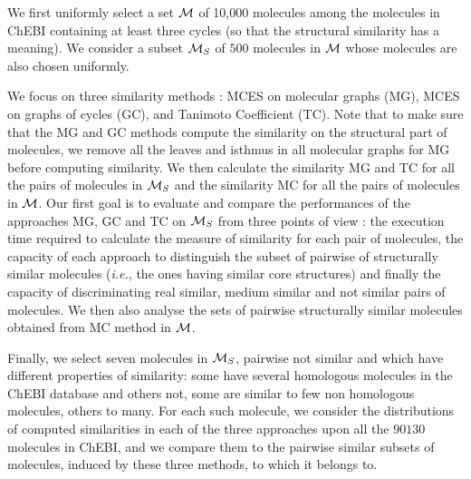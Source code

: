 \documentclass[10pt,letterpaper]{article}
\begin{document}
We first uniformly select a set $\cal M$ of 10,000 molecules among the molecules in ChEBI containing at least three cycles (so that the structural similarity has a meaning). We consider a subset ${\cal M}_S$ of $500$ molecules in $ \cal M $ whose molecules are also chosen uniformly.

We   focus on three similarity methods : MCES on molecular graphs (MG), MCES on graphs of cycles (GC), and Tanimoto Coefficient (TC). Note that to make sure that the MG and GC methods compute the similarity on the structural part of molecules, we remove all the leaves and isthmus in all molecular graphs for MG before computing similarity. We  then calculate the similarity MG and TC for all the pairs of  molecules in ${\cal M}_S$ and the similarity MC for all the pairs of molecules in $ \cal M $.   Our first goal is to evaluate and compare the performances of the approaches MG, GC and TC on ${\cal M}_S$ from three points of view : the execution time required to calculate the measure of similarity for each pair of molecules, the capacity of each approach to distinguish the subset of pairwise  of  structurally  similar molecules (\textit{i.e.}, the ones having similar core structures) and finally the capacity of discriminating real similar, medium similar and not similar pairs of molecules. We then also analyse the sets of pairwise structurally similar molecules obtained from MC method in $ \cal M $.

Finally, we select seven molecules in ${\cal M}_S$, pairwise not similar and which have different properties of   similarity: some have several homologous molecules in the ChEBI database and others not, some are similar to few non homologous molecules, others to many. For each such molecule, we consider the distributions of computed similarities in each of the three approaches upon all the $90130$ molecules in ChEBI, and we compare them to the pairwise similar subsets of molecules, induced by these three methods, to which it belongs to.
\end{document}
